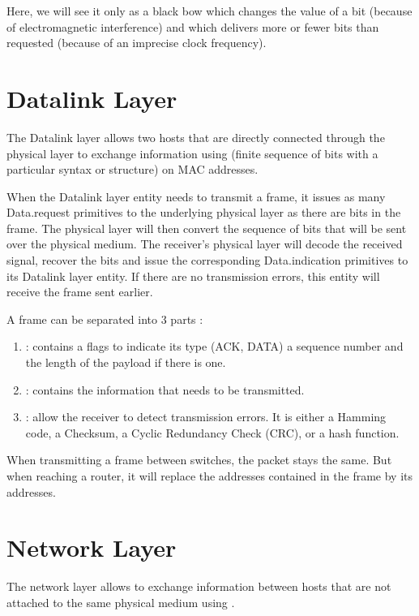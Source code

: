 Here, we will see it only as a black bow which changes the value of a bit (because of electromagnetic interference) and which delivers more or fewer bits than requested (because of an imprecise clock frequency).

\section{Datalink Layer}

The Datalink layer allows two hosts that are directly connected through the physical layer to exchange information using  (finite sequence of bits with a particular syntax or structure) on MAC addresses. 

When the Datalink layer entity needs to transmit a frame, it issues as many Data.request primitives to the underlying physical layer as there are bits in the frame. The physical layer will then convert the sequence of bits that will be sent over the physical medium. The receiver's physical layer will decode the received signal, recover the bits and issue the corresponding Data.indication primitives to its Datalink layer entity. If there are no transmission errors, this entity will receive the frame sent earlier.

A frame can be separated into 3 parts :
\begin{enumerate}
\item {} : contains a flags to indicate its type (ACK, DATA) a sequence number and the length of the payload if there is one.
\item {} : contains the information that needs to be transmitted.
\item {} : allow the receiver to detect transmission errors. It is either a Hamming code, a Checksum, a Cyclic Redundancy Check (CRC), or a hash function.
\end{enumerate}

When transmitting a frame between switches, the packet stays the same. But when reaching a router, it will replace the addresses contained in the frame by its addresses.

\newpage
\section{Network Layer}

The network layer allows to exchange information between hosts that are not attached to the same physical medium using .

